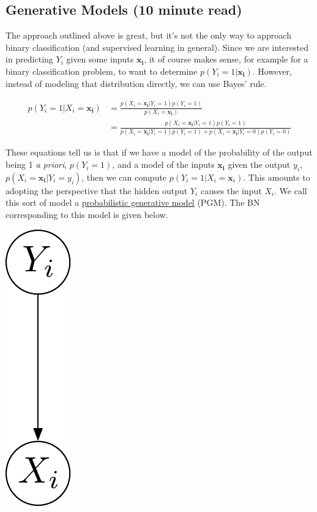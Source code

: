 \documentclass[assignment03_Solutions]{subfiles}
\begin{document}
\subsection{Generative Models (10 minute read)}
The approach outlined above is great, but it's not the only way to approach binary classification (and supervised learning in general).  Since we are interested in predicting $Y_i$ given some inputs $\mathbf{x_i}$, it of course makes sense, for example for a binary classification problem, to want to determine $p(Y_i = 1 | \mathbf{x_i})$.  However, instead of modeling that distribution directly, we can use Bayes' rule.

\begin{align}
p(Y_i  = 1 | X_i = \mathbf{x_i}) &= \frac{p(X_i = \mathbf{x_i} | Y_i = 1) p(Y_i = 1)}{p(X_i = \mathbf{x_i})} \label{eq:pgm} \\
&= \frac{p(X_i = \mathbf{x_i} | Y_i = 1) p(Y_i = 1)}{p(X_i =  \mathbf{x_i} | Y_i = 1) p(Y_i = 1) + p(X_i = \mathbf{x_i} | Y_i = 0) p(Y_i = 0)} \nonumber
\end{align}

These equations tell us is that if we have a model of the probability of the output being 1 \emph{a priori}, $p(Y_i = 1)$, and a model of the inputs $\mathbf{x_i}$ given the output $y_i$, $p(X_i = \mathbf{x_i} | Y_i = y_i)$, then we can compute $p(Y_i = 1 | X_i = \mathbf{x}_i)$.  This amounts to adopting the perspective that the hidden output $Y_i$ causes the input $X_i$.  We call this sort of model a \href{https://en.wikipedia.org/wiki/Generative_model}{probabilistic generative model} (PGM).  The BN corresponding to this model is given below.

\begin{center}
\includegraphics[width=0.05\linewidth]{figures/pgm}
\end{center}
\end{document}
